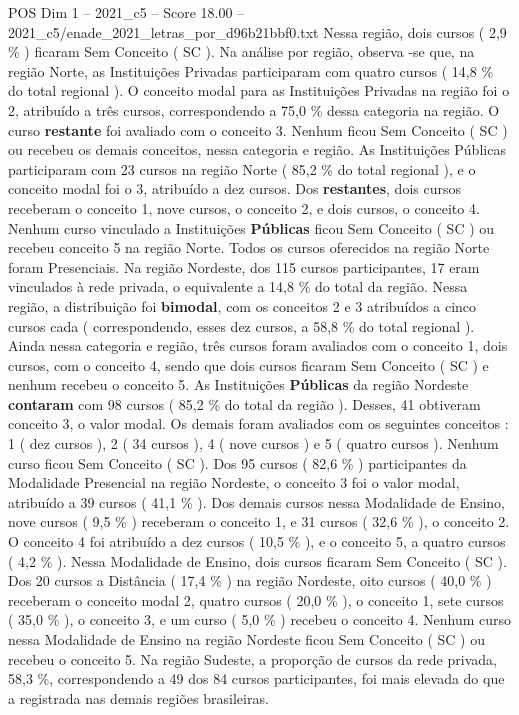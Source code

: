\begin{textsample}{POS Dim 1 – 2021\_c5 – Score 18.00 – 2021\_c5/enade\_2021\_letras\_por\_d96b21bbf0.txt}
Nessa região, dois cursos ( 2,9 \% ) ficaram Sem Conceito ( SC ).
Na análise por região, observa -se que, na região Norte, as Instituições Privadas participaram com quatro cursos ( 14,8 \% do total regional ).
O conceito modal para as Instituições Privadas na região foi o 2, atribuído a três cursos, correspondendo a 75,0 \% dessa categoria na região.
O curso \textbf{restante} foi avaliado com o conceito 3.
Nenhum ficou Sem Conceito ( SC ) ou recebeu os demais conceitos, nessa categoria e região.
As Instituições Públicas participaram com 23 cursos na região Norte ( 85,2 \% do total regional ), e o conceito modal foi o 3, atribuído a dez cursos.
Dos \textbf{restantes}, dois cursos receberam o conceito 1, nove cursos, o conceito 2, e dois cursos, o conceito 4.
Nenhum curso vinculado a Instituições \textbf{Públicas} ficou Sem Conceito ( SC ) ou recebeu conceito 5 na região Norte.
Todos os cursos oferecidos na região Norte foram Presenciais.
Na região Nordeste, dos 115 cursos participantes, 17 eram vinculados à rede privada, o equivalente a 14,8 \% do total da região.
Nessa região, a distribuição foi \textbf{bimodal}, com os conceitos 2 e 3 atribuídos a cinco cursos cada ( correspondendo, esses dez cursos, a 58,8 \% do total regional ).
Ainda nessa categoria e região, três cursos foram avaliados com o conceito 1, dois cursos, com o conceito 4, sendo que dois cursos ficaram Sem Conceito ( SC ) e nenhum recebeu o conceito 5.
As Instituições \textbf{Públicas} da região Nordeste \textbf{contaram} com 98 cursos ( 85,2 \% do total da região ).
Desses, 41 obtiveram conceito 3, o valor modal.
Os demais foram avaliados com os seguintes conceitos : 1 ( dez cursos ), 2 ( 34 cursos ), 4 ( nove cursos ) e 5 ( quatro cursos ).
Nenhum curso ficou Sem Conceito ( SC ).
Dos 95 cursos ( 82,6 \% ) participantes da Modalidade Presencial na região Nordeste, o conceito 3 foi o valor modal, atribuído a 39 cursos ( 41,1 \% ).
Dos demais cursos nessa Modalidade de Ensino, nove cursos ( 9,5 \% ) receberam o conceito 1, e 31 cursos ( 32,6 \% ), o conceito 2.
O conceito 4 foi atribuído a dez cursos ( 10,5 \% ), e o conceito 5, a quatro cursos ( 4,2 \% ).
Nessa Modalidade de Ensino, dois cursos ficaram Sem Conceito ( SC ).
Dos 20 cursos a Distância ( 17,4 \% ) na região Nordeste, oito cursos ( 40,0 \% ) receberam o conceito modal 2, quatro cursos ( 20,0 \% ), o conceito 1, sete cursos ( 35,0 \% ), o conceito 3, e um curso ( 5,0 \% ) recebeu o conceito 4.
Nenhum curso nessa Modalidade de Ensino na região Nordeste ficou Sem Conceito ( SC ) ou recebeu o conceito 5.
Na região Sudeste, a proporção de cursos da rede privada, 58,3 \%, correspondendo a 49 dos 84 cursos participantes, foi mais elevada do que a registrada nas demais regiões brasileiras.

\end{textsample}
